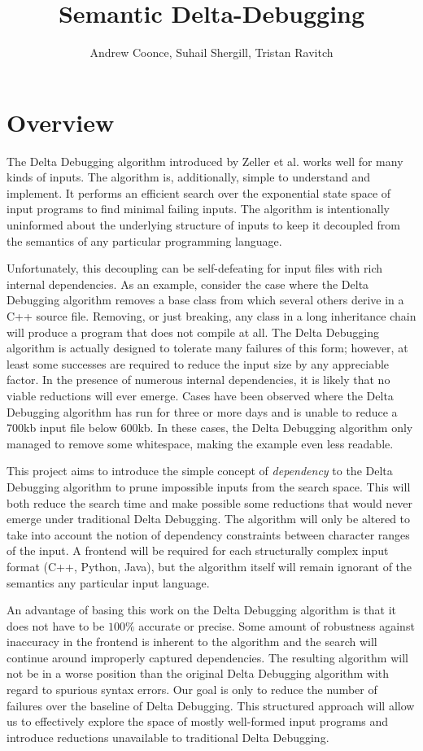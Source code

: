 \documentclass[11pt]{article}
\title{Semantic Delta-Debugging}
\author{
Andrew Coonce, Suhail Shergill, Tristan Ravitch\\
\email{\{coonce, shergill, travitch\}@cs.wisc.edu}
}
\begin{document}
\maketitle

\section{Overview}
The Delta Debugging algorithm introduced by Zeller et al. \cite{dd} works well
for many kinds of inputs. The algorithm is, additionally, simple to understand
and implement. It performs an efficient search over the exponential state space
of input programs to find minimal failing inputs. The algorithm is intentionally
uninformed about the underlying structure of inputs to keep it decoupled from
the semantics of any particular programming language.

Unfortunately, this decoupling can be self-defeating for input files with
rich internal dependencies. As an example, consider the case where the Delta
Debugging algorithm removes a base class from which several others derive in a
C++ source file. Removing, or just breaking, any class in a long inheritance
chain will produce a program that does not compile at all. The Delta Debugging
algorithm is actually designed to tolerate many failures of this form; however,
at least some successes are required to reduce the input size by any appreciable
factor. In the presence of numerous internal dependencies, it is likely that no
viable reductions will ever emerge. Cases have been observed where the Delta
Debugging algorithm has run for three or more days and is unable to reduce a
700kb input file below 600kb.  In these cases, the Delta Debugging algorithm only managed to remove some whitespace, making
the example even less readable.

This project aims to introduce the simple concept of \emph{dependency} to the
Delta Debugging algorithm to prune impossible inputs from the search space.
This will both reduce the search time and make possible some reductions
that would never emerge under traditional Delta Debugging. The algorithm will
only be altered to take into account the notion of dependency constraints
between character ranges of the input. A frontend will be required for each
structurally complex input format (C++, Python, Java), but the algorithm itself
will remain ignorant of the semantics any particular input language.

An advantage of basing this work on the Delta Debugging algorithm is that it
does not have to be $100 \%$ accurate or precise. Some amount of robustness
against inaccuracy in the frontend is inherent to the algorithm and the search
will continue around improperly captured dependencies.  The resulting algorithm
will not be in a worse position than the original Delta Debugging algorithm with
regard to spurious syntax errors.  Our goal is only to reduce the number of failures
over the baseline of Delta Debugging. This structured approach will allow us to
effectively explore the space of mostly well-formed input programs and introduce
reductions unavailable to traditional Delta Debugging.
\end{document}
